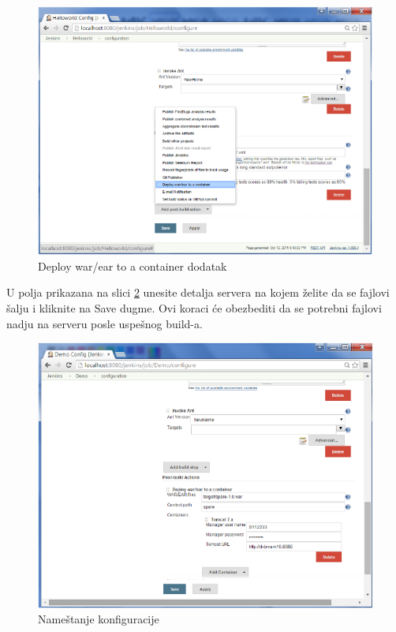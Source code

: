 \begin{figure}
\begin{center}
\includegraphics[scale=0.45]{slike/deploy_war_ear_container.png}
\end{center}
\caption{Deploy war/ear to a container dodatak}
\label{fig:deploy_war_ear_container}
\end{figure}

U polja prikazana na slici \ref{fig:demo_config.png} unesite detalja servera na kojem želite da se fajlovi šalju i kliknite na Save dugme. Ovi koraci će obezbediti da se potrebni fajlovi nadju na serveru posle uspešnog build-a.

\begin{figure}
\begin{center}
\includegraphics[scale=0.45]{slike/demo_config.png}
\end{center}
\caption{Nameštanje konfiguracije}
\label{fig:demo_config.png}
\end{figure}

%


